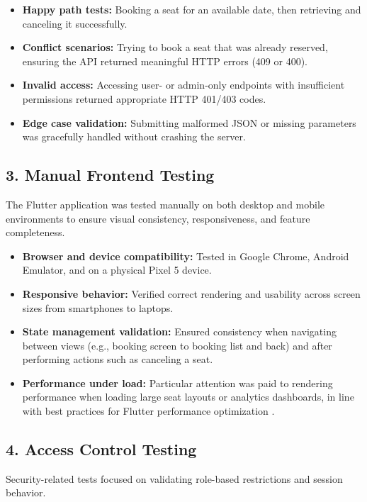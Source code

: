 \documentclass[12pt,a4paper]{report} %
\begin{document}
\begin{itemize}
    \item \textbf{Happy path tests:} Booking a seat for an available date, then retrieving and canceling it successfully.
    \item \textbf{Conflict scenarios:} Trying to book a seat that was already reserved, ensuring the API returned meaningful HTTP errors (409 or 400).
    \item \textbf{Invalid access:} Accessing user- or admin-only endpoints with insufficient permissions returned appropriate HTTP 401/403 codes.
    \item \textbf{Edge case validation:} Submitting malformed JSON or missing parameters was gracefully handled without crashing the server.
\end{itemize}

\subsection*{3. Manual Frontend Testing}

The Flutter application was tested manually on both desktop and mobile environments to ensure visual consistency, responsiveness, and feature completeness.

\begin{itemize}
    \item \textbf{Browser and device compatibility:} Tested in Google Chrome, Android Emulator, and on a physical Pixel 5 device.
    \item \textbf{Responsive behavior:} Verified correct rendering and usability across screen sizes from smartphones to laptops.
    \item \textbf{State management validation:} Ensured consistency when navigating between views (e.g., booking screen to booking list and back) and after performing actions such as canceling a seat.
    \item \textbf{Performance under load:} Particular attention was paid to rendering performance when loading large seat layouts or analytics dashboards, in line with best practices for Flutter performance optimization \cite{garcia2021flutterperf}.
\end{itemize}

\subsection*{4. Access Control Testing}

Security-related tests focused on validating role-based restrictions and session behavior.
\end{document}
